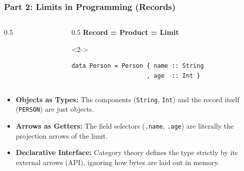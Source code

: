 \documentclass[11pt,t,usepdftitle=false,aspectratio=169]{beamer}
\begin{document}
\begin{frame}[fragile]
\frametitle{Part 2: Limits in Programming (Records)}

  \begin{columns}[c]
    \begin{column}{0.5\textwidth}
      \centering
    \end{column}
    \begin{column}{0.5\textwidth}
      \textbf{Record = Product = Limit}
      
      \medskip
      \begin{uncoverenv}<2->
        \scriptsize
        \begin{verbatim}
data Person = Person { name :: String 
                     , age  :: Int }
        \end{verbatim}
      \end{uncoverenv}
    \end{column}
  \end{columns}

  \vspace{0.3cm}
  \begin{itemize}
    \item<3-> \textbf{Objects as Types:} The components (\texttt{String}, \texttt{Int}) and the record itself (\texttt{PERSON}) are just objects.
    \item<4-> \textbf{Arrows as Getters:} The field selectors (\texttt{.name}, \texttt{.age}) are literally the projection arrows of the limit.
    \item<5-> \textbf{Declarative Interface:} Category theory defines the type strictly by its external arrows (API), ignoring how bytes are laid out in memory.
  \end{itemize}
\end{frame}
\end{document}
